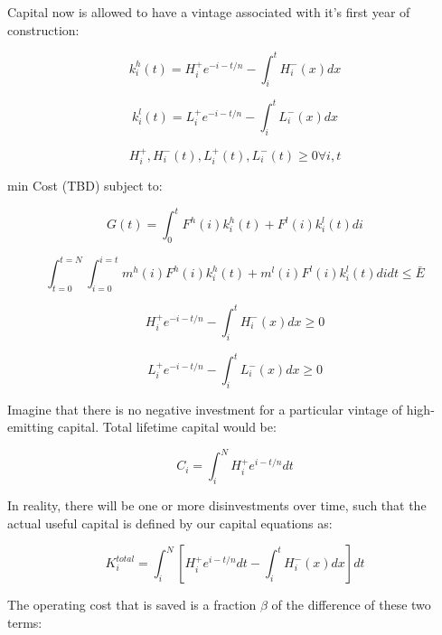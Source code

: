 \documentclass[singlespace]{easychithesis}
\begin{document}
Capital now is allowed to have a vintage associated with it's first year of construction:

\begin{equation}
k_i^h(t) = H_i^+ e^{-i-t/n} - \int_i^t H^-_i(x)dx
\end{equation}

\begin{equation}
k_i^l(t) = L_i^+ e^{-i-t/n} - \int_i^t L^-_i(x)dx
\end{equation}

\begin{equation}
H^+_i, H^-_i(t), L^+_i(t), L^-_i(t) \geq 0 \forall i, t
\end{equation}

min Cost (TBD) subject to:

\begin{equation}
G(t) = \int_0^t F^h(i)k_i^h(t) + F^l(i)k_i^l(t) di
\end{equation}

\begin{equation}
\int_{t=0}^{t=N}\int_{i=0}^{i=t} m^h(i)F^h(i)k_i^h(t) + m^l(i)F^l(i)k_i^l(t) di dt \leq \bar{E}
\end{equation}

\begin{equation}
H_i^+ e^{-i-t/n} - \int_i^t H^-_i(x)dx \geq 0
\end{equation}

\begin{equation}
L_i^+ e^{-i-t/n} - \int_i^t L^-_i(x)dx \geq 0
\end{equation}



Imagine that there is no negative investment for a particular vintage of high-emitting capital. Total lifetime capital would be:

\begin{equation}
C_i = \int_i^N H^+_i e^{i-t/n}dt
\end{equation}

In reality, there will be one or more disinvestments over time, such that the actual useful capital is defined by our capital equations as:

\begin{equation}
K^{total}_i = \int_i^N \left[H^+_i e^{i-t/n} dt - \int_i^t H^-_i(x)dx \right] dt
\end{equation}

The operating cost that is saved is a fraction $\beta$ of the difference of these two terms:
\end{document}
